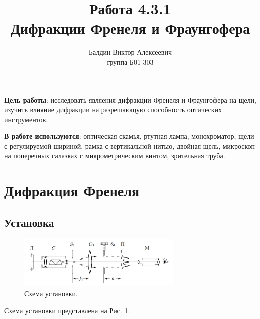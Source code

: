 \documentclass[a4paper, 12pt]{article}%
\author{Балдин Виктор Алексеевич \\
группа Б01-303}
\date{}
\title{\textbf{Работа 4.3.1\\Дифракции Френеля и Фраунгофера}}
\begin{document}
\maketitle
\textbf{Цель работы}: исследовать являения дифракции Френеля и Фраунгофера на щели, изучить влияние дифракции на разрешающую способность оптических инструментов.


\textbf{В работе используются}: оптическая скамья, ртутная лампа, монохроматор, щели с регулируемой шириной, рамка с вертикальной нитью, двойная щель, микроскоп на поперечных салазках с микрометрическим винтом, зрительная труба.
\section{Дифракция Френеля}
\subsection*{Установка}
\begin{figure}[h]
\includegraphics[width=0.7\textwidth]{7.jpg}
\centering
\caption{Схема установки.}
\end{figure}
Схема установки представлена на Рис. 1.\\
\end{document}
